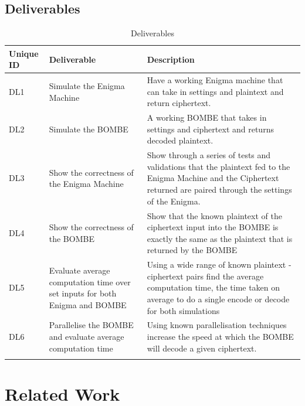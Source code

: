 \documentclass[12pt,a4paper]{article}
\begin{document}
\subsection{Deliverables}

\label{units}
\begin{longtable}{ |p{1.25cm}|p{4cm}|p{7cm}| }\hline\hline
Unique ID & Deliverable & Description \\ \hline
DL1 & Simulate the Enigma Machine & Have a working Enigma machine that can take in settings and plaintext and return ciphertext. \\ \hline
DL2 & Simulate the BOMBE & A working BOMBE that takes in settings and ciphertext and returns decoded plaintext. \\ \hline
DL3 & Show the correctness of the Enigma Machine & Show through a series of tests and validations that the plaintext fed to the Enigma Machine and the Ciphertext returned are paired through the settings of the Enigma. \\ \hline
DL4 & Show the correctness of the BOMBE & Show that the known plaintext of the ciphertext input into the BOMBE is exactly the same as the plaintext that is returned by the BOMBE \\ \hline
DL5 & Evaluate average computation time over set inputs for both Enigma and BOMBE & Using a wide range of known plaintext - ciphertext pairs find the average computation time, the time taken on average to do a single encode or decode for both simulations \\ \hline
DL6 & Parallelise the BOMBE and evaluate average computation time & Using known parallelisation techniques increase the speed at which the BOMBE will decode a given ciphertext. \\ \hline
\caption{Deliverables}
\end{longtable}

\section{Related Work}

\end{document}

